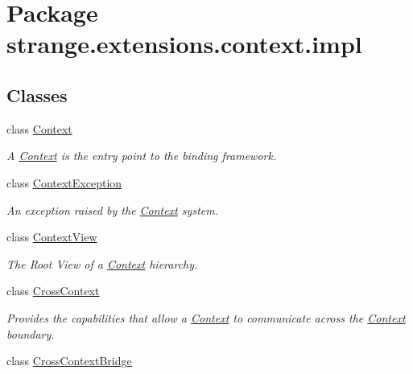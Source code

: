 \hypertarget{namespacestrange_1_1extensions_1_1context_1_1impl}{\section{Package strange.\-extensions.\-context.\-impl}
\label{namespacestrange_1_1extensions_1_1context_1_1impl}
}
\subsection*{Classes}
\begin{DoxyCompactItemize}
\item 
class \hyperlink{classstrange_1_1extensions_1_1context_1_1impl_1_1_context}{Context}
\begin{DoxyCompactList}\small\item\em A \hyperlink{classstrange_1_1extensions_1_1context_1_1impl_1_1_context}{Context} is the entry point to the binding framework. \end{DoxyCompactList}\item 
class \hyperlink{classstrange_1_1extensions_1_1context_1_1impl_1_1_context_exception}{Context\-Exception}
\begin{DoxyCompactList}\small\item\em An exception raised by the \hyperlink{classstrange_1_1extensions_1_1context_1_1impl_1_1_context}{Context} system. \end{DoxyCompactList}\item 
class \hyperlink{classstrange_1_1extensions_1_1context_1_1impl_1_1_context_view}{Context\-View}
\begin{DoxyCompactList}\small\item\em The Root View of a \hyperlink{classstrange_1_1extensions_1_1context_1_1impl_1_1_context}{Context} hierarchy. \end{DoxyCompactList}\item 
class \hyperlink{classstrange_1_1extensions_1_1context_1_1impl_1_1_cross_context}{Cross\-Context}
\begin{DoxyCompactList}\small\item\em Provides the capabilities that allow a \hyperlink{classstrange_1_1extensions_1_1context_1_1impl_1_1_context}{Context} to communicate across the \hyperlink{classstrange_1_1extensions_1_1context_1_1impl_1_1_context}{Context} boundary. \end{DoxyCompactList}\item 
class \hyperlink{classstrange_1_1extensions_1_1context_1_1impl_1_1_cross_context_bridge}{Cross\-Context\-Bridge}

\end{DoxyCompactItemize}
